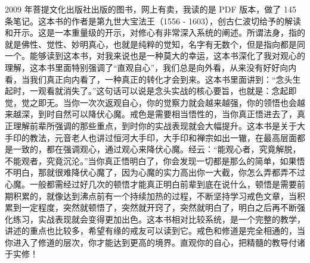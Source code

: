 \begin{book}[《直指法身》]
    2009 年菩提文化出版社出版的图书，网上有卖，我读的是 PDF 版本，做了 145 条笔记。这本书的作者是第九世大宝法王（1556 - 1603），创古仁波切给予的解读和开示。这是一本重量级的开示，对修心有非常深入系统的阐述。所谓法身，指的就是佛性、觉性、妙明真心，也就是纯粹的觉知，名字有无数个，但是指向都是同一个。能够读到这本书，对我来说也是一种莫大的幸运，这本书深化了我对观心的理解，这本书里面特别强调了“直观自心”，我们总是向外看，从来没有好好向内看，当我们真正向内看了，一种真正的转化才会到来。这本书里面讲到：“念头生起时，一观看就消失了。”这句话可以说是念头实战的核心要旨，也就是：念起即觉，觉之即无。当你一次次返观自心，你的觉察力就会越来越强，你的领悟也会越来越深，到时自然可以降伏心魔。戒色是需要相当悟性的，当你真正悟进去了，真正理解前辈所强调的那些重点，到时你的实战表现就会大幅提升。这本书是关于大手印的教法，元音老人也讲过恒河大手印，大手印和禅宗如出一辙，在最高层面都是一致的，都在强调观心，通过观心来降伏心魔。经云：“能观心者，究竟解脱，不能观者，究竟沉沦。”当你真正悟明白了，你会发现一切都是那么的简单，如果悟不明白，那就很难降伏心魔了，因为心魔的实力高出你一大截，你怎么弄都弄不过心魔。一般都需经过好几次的顿悟才能真正明白前辈到底在说什么，顿悟是需要前期积累的，就像达到沸点前有一个持续加热的过程，不断坚持学习戒色文章，当积累到一定程度，突然就顿悟了，突然就开窍了，突然就明白了，明白之后再不断强化练习，实战表现就会变得更加出色。这本书相对比较系统，是一个完整的教学，讲述的重点也比较多，希望有缘的戒友可以读到它。戒色和修道是完全相通的，当你进入了修道的层次，你才能达到更高的境界。直观你的自心，把精髓的教导付诸于实修！
\end{book}
